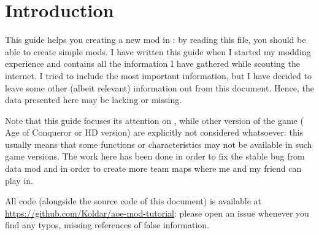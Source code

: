 \chapter{Introduction}

This guide helps you creating a new mod in \aoe{}: by reading this file, you should be able to create simple mods. I have written this guide when I started my \aoe{} modding experience and contains all the information I have gathered while scouting the internet. I tried to include the most important information, but I have decided to leave some other (albeit relevant) information out from this document. Hence, the data presented here may be lacking or missing.

Note that this guide focuses its attention on \aoe{}, while other version of the game (\eg{} Age of Conqueror or HD version) are explicitly not considered whatsoever: this usually means that some functions or characteristics may not be available in such game versions. The work here has been done in order to fix the stable bug from  data mod\cite{steamid:2019} and in order to create more team maps where me and my friend can play in.

All code (alongside the source code of this document) is available at \url{https://github.com/Koldar/aoe-mod-tutorial}: please open an issue whenever you find any typos, missing references of false information.

